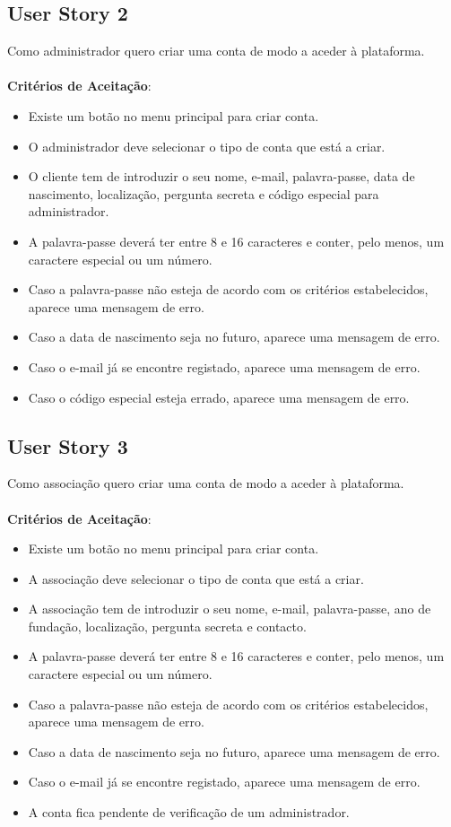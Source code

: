 \documentclass[a4paper,11pt]{article}
\begin{document}
\subsection*{User Story 2}
Como administrador quero criar uma conta de modo a aceder à plataforma.\\\\
\textbf{Critérios de Aceitação}:
\begin{itemize}
  \item Existe um botão no menu principal para criar conta.
  \item O administrador deve selecionar o tipo de conta que está a criar.
  \item O cliente tem de introduzir o seu nome, e-mail, palavra-passe, data de nascimento, localização, pergunta secreta e código especial para administrador.
  \item A palavra-passe deverá ter entre 8 e 16 caracteres e conter, pelo menos, um caractere especial ou um número.
  \item Caso a palavra-passe não esteja de acordo com os critérios estabelecidos, aparece uma mensagem de erro.
  \item Caso a data de nascimento seja no futuro, aparece uma mensagem de erro.
  \item Caso o e-mail já se encontre registado, aparece uma mensagem de erro.
  \item Caso o código especial esteja errado, aparece uma mensagem de erro.
\end{itemize}

\subsection*{User Story 3}
Como associação quero criar uma conta de modo a aceder à plataforma.\\\\
\textbf{Critérios de Aceitação}:
\begin{itemize}
  \item Existe um botão no menu principal para criar conta.
  \item A associação deve selecionar o tipo de conta que está a criar.
  \item A associação tem de introduzir o seu nome, e-mail, palavra-passe, ano de fundação, localização, pergunta secreta e contacto.
  \item A palavra-passe deverá ter entre 8 e 16 caracteres e conter, pelo menos, um caractere especial ou um número.
  \item Caso a palavra-passe não esteja de acordo com os critérios estabelecidos, aparece uma mensagem de erro.
  \item Caso a data de nascimento seja no futuro, aparece uma mensagem de erro.
  \item Caso o e-mail já se encontre registado, aparece uma mensagem de erro.
  \item A conta fica pendente de verificação de um administrador.
\end{itemize}
\end{document}
